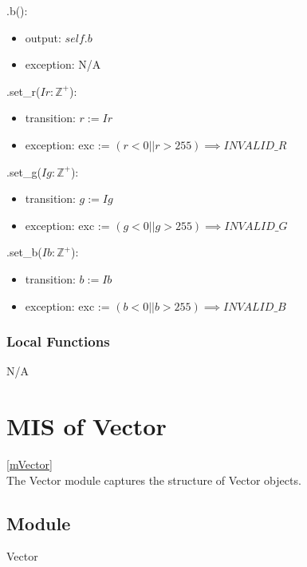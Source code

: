 \documentclass[12pt, titlepage]{article}
\begin{document}
\noindent .b():
\begin{itemize}
	\item output: $self.b$
	\item exception: N/A
\end{itemize} 

\noindent .set\_r($Ir: \mathbb{Z}^+$):
\begin{itemize}
	\item transition: $r := Ir$
	\item exception: exc := $(r < 0 || r > 255) \implies INVALID\_R$ \\
\end{itemize}

\noindent .set\_g($Ig: \mathbb{Z}^+$):
\begin{itemize}
	\item transition: $g := Ig$
	\item exception: exc := $(g < 0 || g > 255) \implies INVALID\_G$ \\
\end{itemize}

\noindent .set\_b($Ib: \mathbb{Z}^+$):
\begin{itemize}
	\item transition: $b := Ib$
	\item exception: exc := $(b < 0 || b > 255) \implies INVALID\_B$ \\
\end{itemize}

\subsubsection{Local Functions}
N/A

\newpage

\section{MIS of Vector} \ref{mVector} \\
The Vector module captures the structure of Vector objects.

\subsection{Module}
Vector
\end{document}
